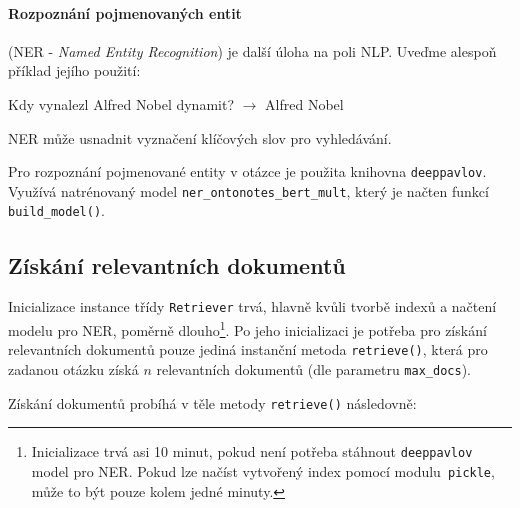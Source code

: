 \paragraph{Rozpoznání pojmenovaných entit}(NER - \emph{Named Entity Recognition}) je další úloha na poli NLP. Uveďme alespoň příklad jejího použití:
\begin{center}
    Kdy vynalezl Alfred Nobel dynamit? $\longrightarrow$ Alfred Nobel
\end{center}
NER může usnadnit vyznačení klíčových slov pro vyhledávání.\par
Pro rozpoznání pojmenované entity v otázce je použita knihovna \texttt{deeppavlov}. Využívá natrénovaný model \texttt{ner\_ontonotes\_bert\_mult}, který je načten funkcí \texttt{build\_model()}.

\subsection{Získání relevantních dokumentů}
Inicializace instance třídy \texttt{Retriever} trvá, hlavně kvůli tvorbě indexů a načtení modelu pro NER, poměrně dlouho\footnote{Inicializace trvá asi 10 minut, pokud není potřeba stáhnout \texttt{deeppavlov} model pro NER. Pokud lze načíst vytvořený index pomocí modulu\texttt{ pickle}, může to být pouze kolem jedné minuty.}. Po jeho inicializaci je potřeba pro získání relevantních dokumentů pouze jediná instanční metoda \texttt{retrieve()}, která pro zadanou otázku získá $n$ relevantních dokumentů (dle parametru \texttt{max\_docs}).\par
Získání dokumentů probíhá v těle metody \texttt{retrieve()} následovně:
